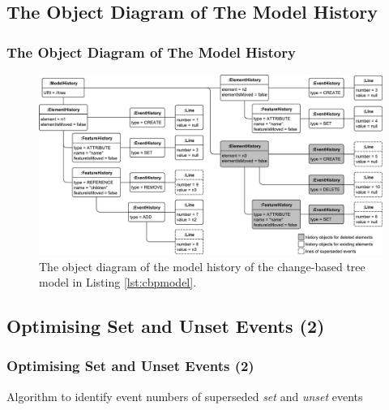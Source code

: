 \documentclass{beamer}
\begin{document}
\begin{frame}
\section{The Object Diagram of The Model History}
\frametitle{The Object Diagram of The Model History}
\begin{figure}[ht]
    \centering
    \includegraphics[width=\linewidth]{history_structure}
    \caption{The object diagram of the model history of the change-based tree model in Listing \ref{lst:cbpmodel}.}
    \label{fig:history_structure}
\end{figure}
\end{frame}

\begin{frame}
\section{Optimising Set and Unset Events (2)}
\frametitle{Optimising Set and Unset Events (2)}
\begin{algorithm}[H]
    \begin{small}
    \end{small}
    \caption{Algorithm to identify event numbers of superseded \emph{set} and \emph{unset} events}
    \label{alg:set_unset_optimisation}
\end{algorithm}
\end{frame}
\end{document}
